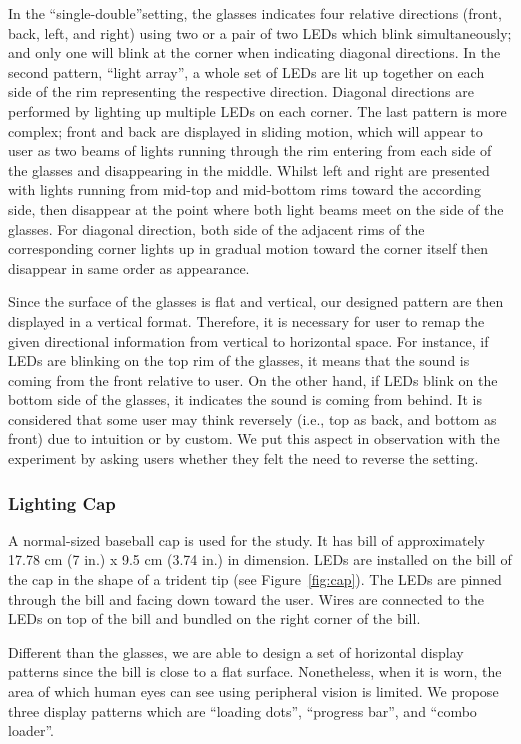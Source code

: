 \documentclass{sigchi}
\begin{document}
In the \textquotedblleft single-double\textquotedblright setting, the glasses indicates four relative directions (front, back, left, and right) using two or a pair of two LEDs which blink simultaneously; and only one will blink at the corner when indicating diagonal directions. In the second pattern, \textquotedblleft light array\textquotedblright, a whole set of LEDs are lit up together on each side of the rim representing the respective direction. Diagonal directions are performed by lighting up multiple LEDs on each corner. The last pattern is more complex; front and back are displayed in sliding motion, which will appear to user as two beams of lights running through the rim entering from each side of the glasses and disappearing in the middle. Whilst left and right are presented with lights running from mid-top and mid-bottom rims toward the according side, then disappear at the point where both light beams meet on the side of the glasses. For diagonal direction, both side of the adjacent rims of the corresponding corner lights up in gradual motion toward the corner itself then disappear in same order as appearance.

Since the surface of the glasses is flat and vertical, our designed pattern are then displayed in a vertical format. Therefore, it is necessary for user to remap the given directional information from vertical to horizontal space. For instance, if LEDs are blinking on the top rim of the glasses, it means that the sound is coming from the front relative to user. On the other hand, if LEDs blink on the bottom side of the glasses, it indicates the sound is coming from behind. It is considered that some user may think reversely (i.e., top as back, and bottom as front) due to intuition or by custom. We put this aspect in observation with the experiment by asking users whether they felt the need to reverse the setting.

\subsubsection{Lighting Cap}
A normal-sized baseball cap is used for the study. It has bill of approximately 17.78 cm (7 in.) x 9.5 cm (3.74 in.) in dimension. LEDs are installed on the bill of the cap in the shape of a trident tip (see Figure~\ref{fig:cap}). The LEDs are pinned through the bill and facing down toward the user. Wires are connected to the LEDs on top of the bill and bundled on the right corner of the bill.

Different than the glasses, we are able to design a set of horizontal display patterns since the bill is close to a flat surface. Nonetheless, when it is worn, the area of which human eyes can see using peripheral vision is limited. We propose three display patterns which are \textquotedblleft loading dots\textquotedblright, \textquotedblleft progress bar\textquotedblright, and \textquotedblleft combo loader\textquotedblright.
\end{document}
